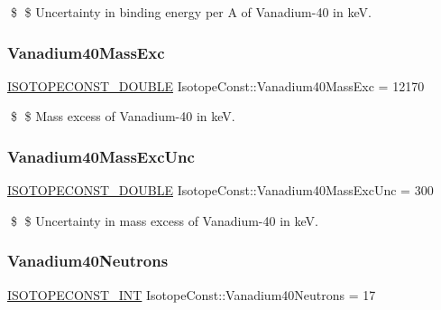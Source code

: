 \$ \$ Uncertainty in binding energy per A of Vanadium-\/40 in keV. \mbox{\label{group___isotope_const-_vanadium-_v40_ga3da72ff458878a02e9288687000bdbad}} 
\subsubsection{\texorpdfstring{Vanadium40\+Mass\+Exc}{Vanadium40MassExc}}
{\footnotesize\ttfamily \mbox{\hyperlink{group___isotope_const-_macros_ga8f45a7272ce02c0b4c65c44636ed719a}{I\+S\+O\+T\+O\+P\+E\+C\+O\+N\+S\+T\+\_\+\+D\+O\+U\+B\+LE}} Isotope\+Const\+::\+Vanadium40\+Mass\+Exc = 12170}

\$ \$ Mass excess of Vanadium-\/40 in keV. \mbox{\label{group___isotope_const-_vanadium-_v40_gae632db0feb9fa38e76db721e1686dac0}} 
\subsubsection{\texorpdfstring{Vanadium40\+Mass\+Exc\+Unc}{Vanadium40MassExcUnc}}
{\footnotesize\ttfamily \mbox{\hyperlink{group___isotope_const-_macros_ga8f45a7272ce02c0b4c65c44636ed719a}{I\+S\+O\+T\+O\+P\+E\+C\+O\+N\+S\+T\+\_\+\+D\+O\+U\+B\+LE}} Isotope\+Const\+::\+Vanadium40\+Mass\+Exc\+Unc = 300}

\$ \$ Uncertainty in mass excess of Vanadium-\/40 in keV. \mbox{\label{group___isotope_const-_vanadium-_v40_ga2eafe46891b70e0ddfa7b818dc9ec72c}} 
\subsubsection{\texorpdfstring{Vanadium40\+Neutrons}{Vanadium40Neutrons}}
{\footnotesize\ttfamily \mbox{\hyperlink{group___isotope_const-_macros_ga5f18360b3e99483a35c32d789e62621c}{I\+S\+O\+T\+O\+P\+E\+C\+O\+N\+S\+T\+\_\+\+I\+NT}} Isotope\+Const\+::\+Vanadium40\+Neutrons = 17}

